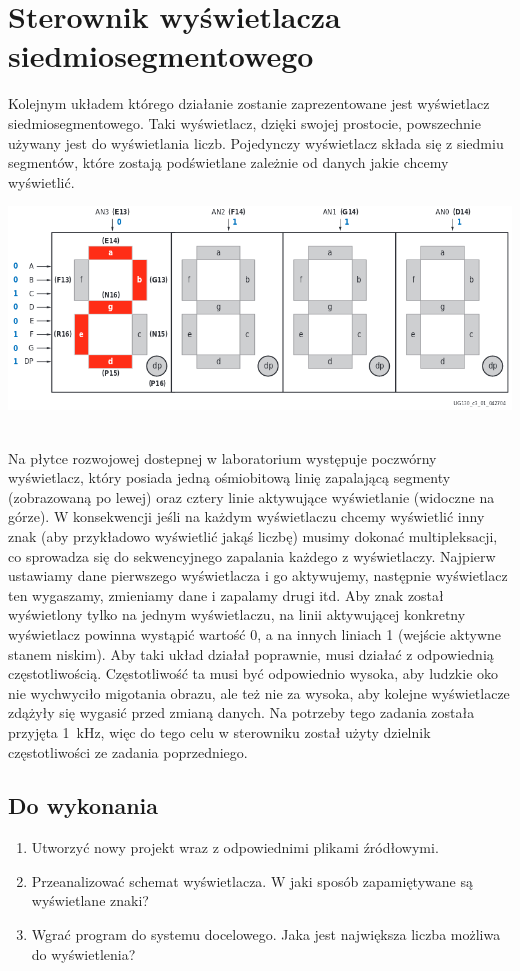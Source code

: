 \documentclass[12pt]{article}
\begin{document}
\section{Sterownik wyświetlacza siedmiosegmentowego}
Kolejnym układem którego działanie zostanie zaprezentowane jest wyświetlacz siedmiosegmentowego. Taki wyświetlacz, dzięki swojej prostocie, powszechnie używany jest do wyświetlania liczb. Pojedynczy wyświetlacz składa się z siedmiu segmentów, które zostają podświetlane zależnie od danych jakie chcemy wyświetlić.\\
\centerline{\includegraphics[width=1\linewidth]{3_1.png}}\\
Na płytce rozwojowej dostepnej w laboratorium występuje poczwórny wyświetlacz, który posiada jedną ośmiobitową linię zapalającą segmenty (zobrazowaną po lewej) oraz cztery linie aktywujące wyświetlanie (widoczne na górze). W konsekwencji jeśli na każdym wyświetlaczu chcemy wyświetlić inny znak (aby przykładowo wyświetlić jakąś liczbę) musimy dokonać multipleksacji, co sprowadza się do sekwencyjnego zapalania każdego z wyświetlaczy. Najpierw ustawiamy dane pierwszego wyświetlacza i go aktywujemy, następnie wyświetlacz ten wygaszamy, zmieniamy dane i zapalamy drugi itd. Aby znak został wyświetlony tylko na jednym wyświetlaczu, na linii aktywującej konkretny wyświetlacz powinna wystąpić wartość 0, a na innych liniach 1 (wejście aktywne stanem niskim). Aby taki układ działał poprawnie, musi działać z odpowiednią częstotliwością. Częstotliwość ta musi być odpowiednio wysoka, aby ludzkie oko nie wychwyciło migotania obrazu, ale też nie za wysoka, aby kolejne wyświetlacze zdążyły się wygasić przed zmianą danych. Na potrzeby tego zadania została przyjęta 1~kHz, więc do tego celu w sterowniku został użyty dzielnik częstotliwości ze zadania poprzedniego.
\subsection{Do wykonania}
\begin{enumerate}[wide, labelwidth=!, labelindent=0pt]	
\item Utworzyć nowy projekt wraz z odpowiednimi plikami źródłowymi.
\item Przeanalizować schemat wyświetlacza. W jaki sposób zapamiętywane są wyświetlane znaki?
\item Wgrać program do systemu docelowego. Jaka jest największa liczba możliwa do wyświetlenia?
\end{enumerate}
\end{document}
